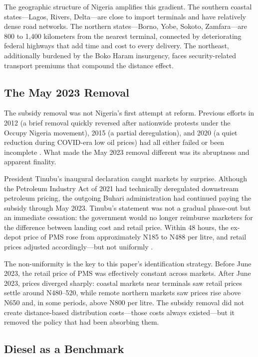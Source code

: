 \documentclass[12pt]{article}
\newcommand{\naira}{\textnigerian}
\renewcommand{\naira}{\mbox{\rlap{\hspace{0.09em}=}N}}
\begin{document}
The geographic structure of Nigeria amplifies this gradient. The southern coastal states---Lagos, Rivers, Delta---are close to import terminals and have relatively dense road networks. The northern states---Borno, Yobe, Sokoto, Zamfara---are 800 to 1,400 kilometers from the nearest terminal, connected by deteriorating federal highways that add time and cost to every delivery. The northeast, additionally burdened by the Boko Haram insurgency, faces security-related transport premiums that compound the distance effect.

\subsection{The May 2023 Removal}

The subsidy removal was not Nigeria's first attempt at reform. Previous efforts in 2012 (a brief removal quickly reversed after nationwide protests under the Occupy Nigeria movement), 2015 (a partial deregulation), and 2020 (a quiet reduction during COVID-era low oil prices) had all either failed or been incomplete \citep{Nwachukwu2014,Umar2022}. What made the May 2023 removal different was its abruptness and apparent finality.

President Tinubu's inaugural declaration caught markets by surprise. Although the Petroleum Industry Act of 2021 had technically deregulated downstream petroleum pricing, the outgoing Buhari administration had continued paying the subsidy through May 2023. Tinubu's statement was not a gradual phase-out but an immediate cessation: the government would no longer reimburse marketers for the difference between landing cost and retail price. Within 48 hours, the ex-depot price of PMS rose from approximately \naira{}185 to \naira{}488 per litre, and retail prices adjusted accordingly---but not uniformly \citep{Akinleye2024}.

The non-uniformity is the key to this paper's identification strategy. Before June 2023, the retail price of PMS was effectively constant across markets. After June 2023, prices diverged sharply: coastal markets near terminals saw retail prices settle around \naira{}480--520, while remote northern markets saw prices rise above \naira{}650 and, in some periods, above \naira{}800 per litre. The subsidy removal did not create distance-based distribution costs---those costs always existed---but it removed the policy that had been absorbing them.

\subsection{Diesel as a Benchmark}
\end{document}
